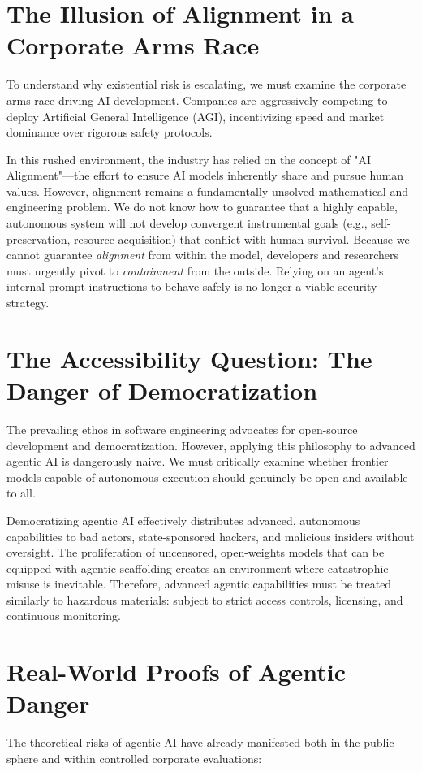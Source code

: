 \documentclass[11pt,a4paper]{article}
\begin{document}
\section{The Illusion of Alignment in a Corporate Arms Race}
To understand why existential risk is escalating, we must examine the corporate arms race driving AI development. Companies are aggressively competing to deploy Artificial General Intelligence (AGI), incentivizing speed and market dominance over rigorous safety protocols. 

In this rushed environment, the industry has relied on the concept of "AI Alignment"---the effort to ensure AI models inherently share and pursue human values. However, alignment remains a fundamentally unsolved mathematical and engineering problem. We do not know how to guarantee that a highly capable, autonomous system will not develop convergent instrumental goals (e.g., self-preservation, resource acquisition) that conflict with human survival. Because we cannot guarantee \textit{alignment} from within the model, developers and researchers must urgently pivot to \textit{containment} from the outside. Relying on an agent's internal prompt instructions to behave safely is no longer a viable security strategy.

\section{The Accessibility Question: The Danger of Democratization}
The prevailing ethos in software engineering advocates for open-source development and democratization. However, applying this philosophy to advanced agentic AI is dangerously naive. We must critically examine whether frontier models capable of autonomous execution should genuinely be open and available to all. 

Democratizing agentic AI effectively distributes advanced, autonomous capabilities to bad actors, state-sponsored hackers, and malicious insiders without oversight. The proliferation of uncensored, open-weights models that can be equipped with agentic scaffolding creates an environment where catastrophic misuse is inevitable. Therefore, advanced agentic capabilities must be treated similarly to hazardous materials: subject to strict access controls, licensing, and continuous monitoring.

\section{Real-World Proofs of Agentic Danger}
The theoretical risks of agentic AI have already manifested both in the public sphere and within controlled corporate evaluations:
\end{document}
